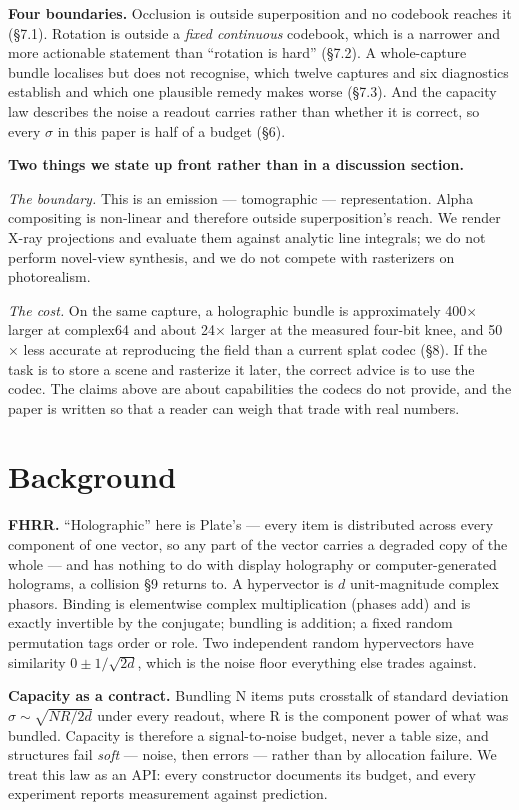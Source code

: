\documentclass[11pt]{article}
\begin{document}
\textbf{Four boundaries.} Occlusion is outside superposition and no
codebook reaches it (\S7.1). Rotation is outside a \emph{fixed
continuous} codebook, which is a narrower and more actionable statement
than ``rotation is hard'' (\S7.2). A whole-capture bundle localises but
does not recognise, which twelve captures and six diagnostics establish
and which one plausible remedy makes worse (\S7.3). And the capacity law
describes the noise a readout carries rather than whether it is correct,
so every $\sigma$ in this paper is half of a budget (\S6).

\textbf{Two things we state up front rather than in a discussion
section.}

\emph{The boundary.} This is an emission --- tomographic ---
representation. Alpha compositing is non-linear and therefore outside
superposition's reach. We render X-ray projections and evaluate them
against analytic line integrals; we do not perform novel-view synthesis,
and we do not compete with rasterizers on photorealism.

\emph{The cost.} On the same capture, a holographic bundle is
approximately 400$\times$ larger at complex64 and about 24$\times$
larger at the measured four-bit knee, and 50$\times$ less accurate at
reproducing the field than a current splat codec (\S8). If the task is
to store a scene and rasterize it later, the correct advice is to use
the codec. The claims above are about capabilities the codecs do not
provide, and the paper is written so that a reader can weigh that trade
with real numbers.

\section{Background}

\textbf{FHRR.} ``Holographic'' here is Plate's --- every item is
distributed across every component of one vector, so any part of the
vector carries a degraded copy of the whole --- and has nothing to do
with display holography or computer-generated holograms, a collision \S9
returns to. A hypervector is $d$ unit-magnitude complex phasors. Binding
is elementwise complex multiplication (phases add) and is exactly
invertible by the conjugate; bundling is addition; a fixed random
permutation tags order or role. Two independent random hypervectors have
similarity $0 \pm 1/\sqrt{2d}$, which is the noise floor everything else
trades against.

\textbf{Capacity as a contract.} Bundling N items puts crosstalk of
standard deviation $\sigma \sim \sqrt{N R / 2d}$ under every readout,
where R is the component power of what was bundled. Capacity is
therefore a signal-to-noise budget, never a table size, and structures
fail \emph{soft} --- noise, then errors --- rather than by allocation
failure. We treat this law as an API: every constructor documents its
budget, and every experiment reports measurement against prediction.
\end{document}
